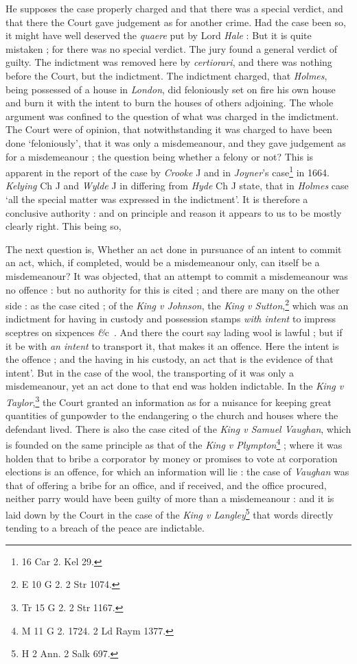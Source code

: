 \documentclass[a4paper]{article}
\newcommand{\etc}{\emph{\&}c\ }
\begin{document}
He supposes the case properly charged and that there was a special verdict, and that there the Court gave judgement as for another crime. Had the case been so, it might have well deserved the \emph{quaere} put by Lord \emph{Hale} : But it is quite mistaken ; for there was no special verdict. The jury found a general verdict of guilty. The indictment was removed here by \emph{certiorari}, and there was nothing before the Court, but the indictment. The indictment charged, that \emph{Holmes}, being possessed of a house in \emph{London}, did feloniously set on fire his own house and burn it with the intent to burn the houses  of others adjoining. The whole argument was confined to the question of what was charged in the imdictment. The Court were of opinion, that notwithstanding it was charged to have been done `feloniously', that it was only a misdemeanour, and they gave judgement as for a misdemeanour ; the question being whether a felony or not? This is apparent in the report of the case by \emph{Crooke} J and in \emph{Joyner}'s case\footnote{16 Car 2. Kel 29.} in 1664. \emph{Kelying} Ch J and \emph{Wylde} J in differing from \emph{Hyde} Ch J state, that in \emph{Holmes} case `all the special matter was expressed in the indictment'. It is therefore a conclusive authority : and on principle and reason it appears to us to be mostly clearly right. This being so,

The next question is, Whether an act done in pursuance of an intent to commit an act, which, if completed, would be a misdemeanour only, can itself be a misdemeanour? It was objected, that an attempt to commit a misdemeanour was no offence : but no authority for this is cited ; and there are many on the other side : as the case cited ; of the \emph{King v Johnson}, the \emph{King v Sutton},\footnote{E 10 G 2. 2 Str 1074.} which was an indictment for having in custody and possession stamps \emph{with intent} to impress sceptres on sixpences \etc. And there the court say lading wool is lawful ; but if it be with \emph{an intent} to transport it, that makes it an offence. Here the intent is the offence ; and the having in his custody, an act that is the evidence of that intent'. But in the case of the wool, the transporting of it was only a misdemeanour, yet an act done to that end was holden indictable. In the \emph{King v Taylor},\footnote{Tr 15 G 2. 2 Str 1167.} the Court granted an information as for a nuisance for keeping great quantities of gunpowder to the endangering o the church and houses where the defendant lived. There is also the case cited of the \emph{King v Samuel Vaughan}, which is founded on the same principle as that of the \emph{King v Plympton}\footnote{M 11 G 2. 1724. 2 Ld Raym 1377.} ; where it was holden that to bribe a corporator by money or promises to vote at corporation elections is an offence, for which an information will lie : the case of \emph{Vaughan} was that of offering a bribe for an office, and if received, and the office procured, neither parry would have been guilty of more than a misdemeanour : and it is laid down by the Court in the case of the \emph{King v Langley}\footnote{H 2 Ann. 2 Salk 697.} that words directly tending to a breach of the peace are indictable.
\end{document}
